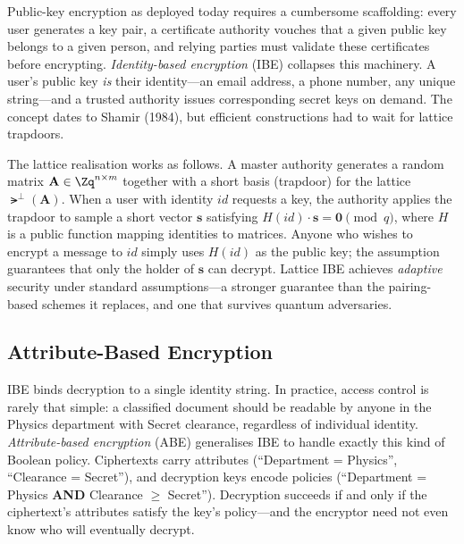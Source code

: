Public-key encryption as deployed today requires a cumbersome scaffolding: every user generates a key pair, a certificate authority vouches that a given public key belongs to a given person, and relying parties must validate these certificates before encrypting.  \emph{Identity-based encryption} (IBE) collapses this machinery.  A user's public key \emph{is} their identity---an email address, a phone number, any unique string---and a trusted authority issues corresponding secret keys on demand.  The concept dates to Shamir (1984), but efficient constructions had to wait for lattice trapdoors.

The lattice realisation works as follows.  A master authority generates a random matrix $\mathbf{A} \in \Zq^{n \times m}$ together with a short basis (trapdoor) for the lattice $\lat^\perp(\mathbf{A})$.  When a user with identity $\mathit{id}$ requests a key, the authority applies the trapdoor to sample a short vector $\mathbf{s}$ satisfying $H(\mathit{id}) \cdot \mathbf{s} = \mathbf{0} \pmod{q}$, where $H$ is a public function mapping identities to matrices.  Anyone who wishes to encrypt a message to $\mathit{id}$ simply uses $H(\mathit{id})$ as the public key; the \lwe{} assumption guarantees that only the holder of $\mathbf{s}$ can decrypt.  Lattice IBE achieves \emph{adaptive} security under standard \lwe{} assumptions---a stronger guarantee than the pairing-based schemes it replaces, and one that survives quantum adversaries.


\subsection{Attribute-Based Encryption}
\label{subsec:abe}

IBE binds decryption to a single identity string.  In practice, access control is rarely that simple: a classified document should be readable by anyone in the Physics department with Secret clearance, regardless of individual identity.  \emph{Attribute-based encryption} (ABE) generalises IBE to handle exactly this kind of Boolean policy.  Ciphertexts carry attributes (``Department = Physics'', ``Clearance = Secret''), and decryption keys encode policies (``Department = Physics \textbf{AND} Clearance $\geq$ Secret'').  Decryption succeeds if and only if the ciphertext's attributes satisfy the key's policy---and the encryptor need not even know who will eventually decrypt.

